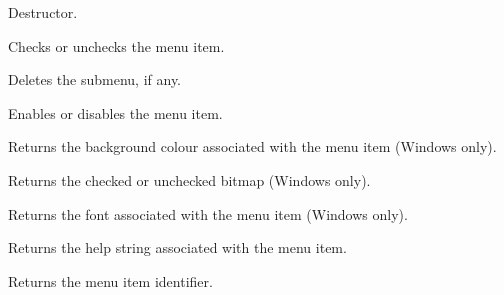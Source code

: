 

Destructor.

\label{wxmenuitemcheck}


Checks or unchecks the menu item.

\label{wxmenuitemdeletesubmenu}


Deletes the submenu, if any.

\label{wxmenuitemenable}


Enables or disables the menu item.

\label{wxmenuitemgetbackgroundcolour}


Returns the background colour associated with the menu item (Windows only).

\label{wxmenuitemgetbitmap}


Returns the checked or unchecked bitmap (Windows only).

\label{wxmenuitemgetfont}


Returns the font associated with the menu item (Windows only).

\label{wxmenuitemgethelp}


Returns the help string associated with the menu item.

\label{wxmenuitemgetid}


Returns the menu item identifier.

\label{wxmenuitemgetkind}


